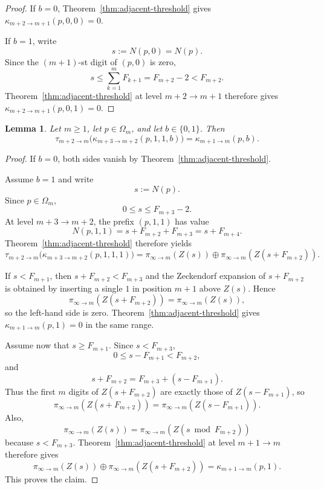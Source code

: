 \documentclass[11pt,reqno]{amsart}
\numberwithin{equation}{section}
\theoremstyle{plain}
\newtheorem{lemma}[theorem]{Lemma}
\theoremstyle{definition}
\theoremstyle{remark}
\begin{document}
\begin{proof}
If $b=0$, Theorem~\ref{thm:adjacent-threshold} gives
$\kappa_{m+2\to m+1}(p,0,0)=0$.

If $b=1$, write
\[
s:=N(p,0)=N(p).
\]
Since the $(m+1)$-st digit of $(p,0)$ is zero,
\[
s\le \sum_{k=1}^m F_{k+1}=F_{m+2}-2<F_{m+2}.
\]
Theorem~\ref{thm:adjacent-threshold} at level $m+2\to m+1$ therefore gives
$\kappa_{m+2\to m+1}(p,0,1)=0$.
\end{proof}

\begin{lemma}
\label{lem:double-one-reduction}
Let $m\ge 1$, let $p\in\Omega_m$, and let $b\in\{0,1\}$.  Then
\[
\tau_{m+2\to m}\bigl(\kappa_{m+3\to m+2}(p,1,1,b)\bigr)
=
\kappa_{m+1\to m}(p,b).
\]
\end{lemma}

\begin{proof}
If $b=0$, both sides vanish by Theorem~\ref{thm:adjacent-threshold}.

Assume $b=1$ and write
\[
s:=N(p).
\]
Since $p\in\Omega_m$,
\[
0\le s\le F_{m+3}-2.
\]
At level $m+3\to m+2$, the prefix $(p,1,1)$ has value
\[
N(p,1,1)=s+F_{m+2}+F_{m+3}=s+F_{m+4}.
\]
Theorem~\ref{thm:adjacent-threshold} therefore yields
\[
\tau_{m+2\to m}\bigl(\kappa_{m+3\to m+2}(p,1,1,1)\bigr)
=
\pi_{\infty\to m}(Z(s))
\oplus
\pi_{\infty\to m}(Z(s+F_{m+2})).
\]

If $s<F_{m+1}$, then $s+F_{m+2}<F_{m+3}$ and the Zeckendorf expansion of
$s+F_{m+2}$ is obtained by inserting a single $1$ in position $m+1$ above
$Z(s)$.  Hence
\[
\pi_{\infty\to m}(Z(s+F_{m+2}))=\pi_{\infty\to m}(Z(s)),
\]
so the left-hand side is zero.  Theorem~\ref{thm:adjacent-threshold} gives
$\kappa_{m+1\to m}(p,1)=0$ in the same range.

Assume now that $s\ge F_{m+1}$.  Since $s<F_{m+3}$,
\[
0\le s-F_{m+1}<F_{m+2},
\]
and
\[
s+F_{m+2}=F_{m+3}+(s-F_{m+1}).
\]
Thus the first $m$ digits of $Z(s+F_{m+2})$ are exactly those of
$Z(s-F_{m+1})$, so
\[
\pi_{\infty\to m}(Z(s+F_{m+2}))
=
\pi_{\infty\to m}(Z(s-F_{m+1})).
\]
Also,
\[
\pi_{\infty\to m}(Z(s))
=
\pi_{\infty\to m}(Z(s\bmod F_{m+2}))
\]
because $s<F_{m+3}$.  Theorem~\ref{thm:adjacent-threshold} at level
$m+1\to m$ therefore gives
\[
\pi_{\infty\to m}(Z(s))
\oplus
\pi_{\infty\to m}(Z(s+F_{m+2}))
=
\kappa_{m+1\to m}(p,1).
\]
This proves the claim.
\end{proof}
\end{document}
